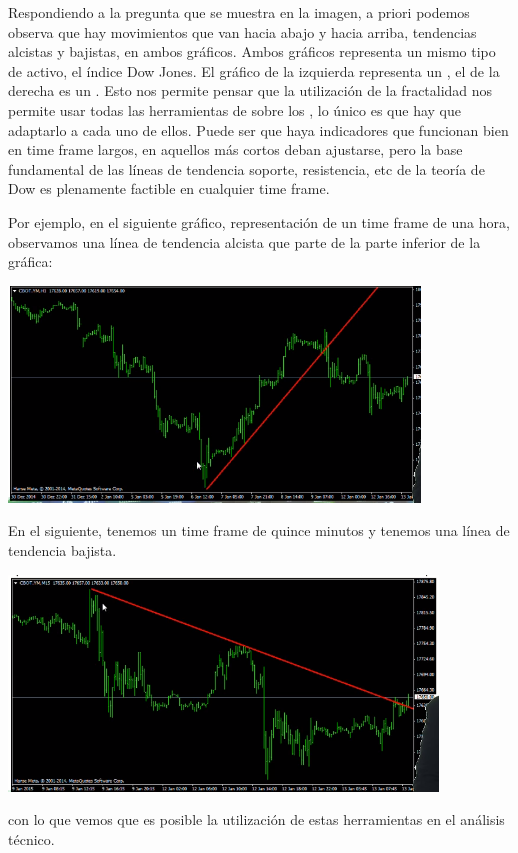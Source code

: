 Respondiendo a la pregunta que se muestra en la imagen, a priori podemos observa que hay movimientos que van hacia abajo y hacia arriba, tendencias alcistas y bajistas, en ambos gráficos. Ambos gráficos representa un mismo tipo de activo, el índice Dow Jones. El gráfico de la izquierda representa un , el de la derecha es un . Esto nos permite pensar que la utilización de la fractalidad nos permite usar todas las herramientas de  sobre los , lo único es que hay que adaptarlo a cada uno de ellos. Puede ser que haya indicadores que funcionan bien en time frame largos, en aquellos más cortos deban ajustarse, pero la base fundamental de las líneas de tendencia soporte,  resistencia, etc de la teoría de Dow es plenamente factible en cualquier time frame.

Por ejemplo, en el siguiente gráfico, representación de un time frame de una hora, observamos una línea de tendencia alcista que parte de la parte inferior de la gráfica:

\begin{center}
    \includegraphics[scale=.80]{images/time-frame-03.png}
\end{center}

En el siguiente, tenemos un time frame de quince minutos y tenemos una línea de tendencia bajista.

\begin{center}
    \includegraphics[scale=.80]{images/time-frame-04.png}
\end{center}

con lo que vemos que es posible la utilización de estas herramientas en el análisis técnico.


